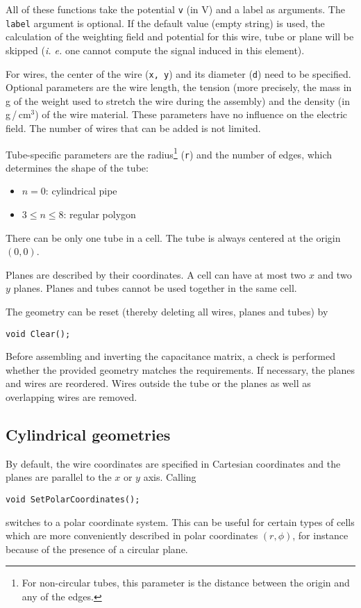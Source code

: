 All of these functions take the potential \texttt{v} (in V) 
and a label as arguments. 
The \texttt{label} argument is optional. If the default value 
(empty string) is used, the calculation of the weighting field and potential for this wire, tube or plane will be skipped (\textit{i. e.} one cannot compute the signal induced in this element).
 
For wires, the center of the wire (\texttt{x, y}) 
and its diameter (\texttt{d}) need to be specified. 
Optional parameters are the wire length, the tension (more precisely, the 
mass in g of the weight used to stretch the wire during the assembly) and 
the density (in g\,/\,cm\(^{3}\)) of the wire material. 
These parameters have no influence on the electric field. 
The number of wires that can be added is not limited.

Tube-specific parameters are the radius\footnote{For non-circular tubes, this parameter is the distance between the origin and any of the edges.} (\texttt{r}) and the number of edges, which determines the shape of the tube:
  \begin{itemize}
    \item
    \(n = 0\): cylindrical pipe
    \item
    \(3 \le n \le 8\): regular polygon 
  \end{itemize}
There can be only one tube in a cell. 
The tube is always centered at the origin \(\left(0, 0\right)\).

Planes are described by their coordinates. 
A cell can have at most two \(x\) and two \(y\) planes. 
Planes and tubes cannot be used together in the same cell.

The geometry can be reset (thereby deleting all wires, planes and tubes) by
\begin{lstlisting}
void Clear();
\end{lstlisting}

Before assembling and inverting the capacitance matrix, 
a check is performed whether the provided geometry matches the requirements.
If necessary, the planes and wires are reordered. 
Wires outside the tube or the planes as well as overlapping wires are removed.

\subsection{Cylindrical geometries}

By default, the wire coordinates are specified in Cartesian coordinates and 
the planes are parallel to the $x$ or $y$ axis.
Calling 
\begin{lstlisting}
void SetPolarCoordinates();
\end{lstlisting} 
switches to a polar coordinate system. This can be useful for 
certain types of cells which are more conveniently described in polar coordinates
$\left(r, \phi\right)$, for instance because of the presence of a circular plane. 

